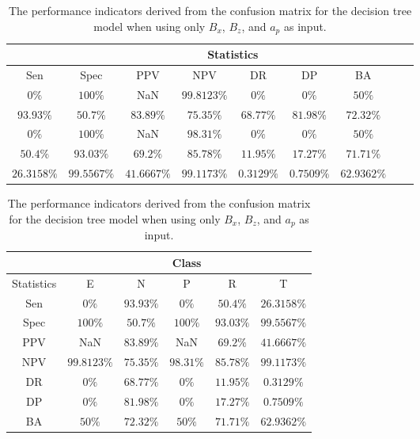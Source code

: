 \begin{table}[!ht]
	\centering
	\begin{tabular}{|c|c|c|c|c|c|c|c|c|}
		\hline
		 & \multicolumn{7}{c|}{Statistics} \\ \hline
		Sen & Spec & PPV & NPV & DR & DP & BA \\ \hline
		$0\%$ & $100\%$ & NaN & $99.8123\%$ & $0\%$ & $0\%$ & $50\%$ \\ \hline
		$93.93\%$ & $50.7\%$ & $83.89\%$ & $75.35\%$ & $68.77\%$ & $81.98\%$ & $72.32\%$ \\ \hline
		$0\%$ & $100\%$ & NaN & $98.31\%$ & $0\%$ & $0\%$ & $50\%$ \\ \hline
		$50.4\%$ & $93.03\%$ & $69.2\%$ & $85.78\%$ & $11.95\%$ & $17.27\%$ & $71.71\%$ \\ \hline
		$26.3158\%$ & $99.5567\%$ & $41.6667\%$ & $99.1173\%$ & $0.3129\%$ & $0.7509\%$ & $62.9362\%$ \\ \hline
	\end{tabular}
	\caption{The performance indicators derived from the confusion matrix for the decision tree model when using only $B_{x}$, $B_{z}$, and $a_{p}$ as input.}
	\label{tab:cs:xzap:C5.0}
\end{table}

\begin{table}[!ht]
	\centering
	\begin{tabular}{|c|c|c|c|c|c|}
		\hline
		 & \multicolumn{5}{c|}{Class} \\ \hline
		Statistics & E & N & P & R & T \\ \hline
		Sen & $0\%$ & $93.93\%$ & $0\%$ & $50.4\%$ & $26.3158\%$ \\ \hline
		Spec & $100\%$ & $50.7\%$ & $100\%$ & $93.03\%$ & $99.5567\%$ \\ \hline
		PPV & NaN & $83.89\%$ & NaN & $69.2\%$ & $41.6667\%$ \\ \hline
		NPV & $99.8123\%$ & $75.35\%$ & $98.31\%$ & $85.78\%$ & $99.1173\%$ \\ \hline
		DR & $0\%$ & $68.77\%$ & $0\%$ & $11.95\%$ & $0.3129\%$ \\ \hline
		DP & $0\%$ & $81.98\%$ & $0\%$ & $17.27\%$ & $0.7509\%$ \\ \hline
		BA & $50\%$ & $72.32\%$ & $50\%$ & $71.71\%$ & $62.9362\%$ \\ \hline
	\end{tabular}
	\caption{The performance indicators derived from the confusion matrix for the decision tree model when using only $B_{x}$, $B_{z}$, and $a_{p}$ as input.}
	\label{tab:cs:reverse:xzap:C5.0}
\end{table}


